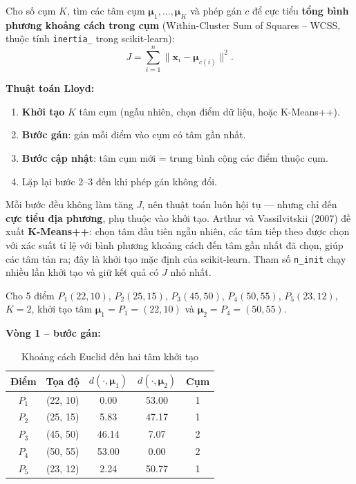 \begin{definition}
Cho số cụm $K$, tìm các tâm cụm $\boldsymbol{\mu}_1, \dots, \boldsymbol{\mu}_K$ và phép gán $c$ để cực tiểu \textbf{tổng bình phương khoảng cách trong cụm} (Within-Cluster Sum of Squares -- WCSS, thuộc tính \texttt{inertia\_} trong scikit-learn):
\begin{equation}
    J = \sum_{i=1}^{n} \big\|\mathbf{x}_i - \boldsymbol{\mu}_{c(i)}\big\|^2 .
\end{equation}
\end{definition}

\noindent\textbf{Thuật toán Lloyd:}
\begin{enumerate}
    \item \textbf{Khởi tạo} $K$ tâm cụm (ngẫu nhiên, chọn điểm dữ liệu, hoặc K-Means++).
    \item \textbf{Bước gán}: gán mỗi điểm vào cụm có tâm gần nhất.
    \item \textbf{Bước cập nhật}: tâm cụm mới = trung bình cộng các điểm thuộc cụm.
    \item Lặp lại bước 2--3 đến khi phép gán không đổi.
\end{enumerate}
Mỗi bước đều không làm tăng $J$, nên thuật toán luôn hội tụ --- nhưng chỉ đến \textbf{cực tiểu địa phương}, phụ thuộc vào khởi tạo. Arthur và Vassilvitskii (2007) đề xuất \textbf{K-Means++}: chọn tâm đầu tiên ngẫu nhiên, các tâm tiếp theo được chọn với xác suất tỉ lệ với bình phương khoảng cách đến tâm gần nhất đã chọn, giúp các tâm tản ra; đây là khởi tạo mặc định của scikit-learn. Tham số \texttt{n\_init} chạy nhiều lần khởi tạo và giữ kết quả có $J$ nhỏ nhất.

\begin{example}
Cho 5 điểm $P_1(22, 10)$, $P_2(25, 15)$, $P_3(45, 50)$, $P_4(50, 55)$, $P_5(23, 12)$, $K = 2$, khởi tạo tâm $\boldsymbol{\mu}_1 = P_1 = (22, 10)$ và $\boldsymbol{\mu}_2 = P_4 = (50, 55)$.
\end{example}

\noindent\textbf{Vòng 1 -- bước gán:}
\begin{table}[H]
\centering
\begin{tabular}{|c|c|c|c|c|}
\hline
\textbf{Điểm} & \textbf{Tọa độ} & $d(\cdot, \boldsymbol{\mu}_1)$ & $d(\cdot, \boldsymbol{\mu}_2)$ & \textbf{Cụm} \\
\hline
$P_1$ & (22, 10) & 0.00 & 53.00 & 1 \\ \hline
$P_2$ & (25, 15) & 5.83 & 47.17 & 1 \\ \hline
$P_3$ & (45, 50) & 46.14 & 7.07 & 2 \\ \hline
$P_4$ & (50, 55) & 53.00 & 0.00 & 2 \\ \hline
$P_5$ & (23, 12) & 2.24 & 50.77 & 1 \\ \hline
\end{tabular}
\caption{Khoảng cách Euclid đến hai tâm khởi tạo}
\end{table}

